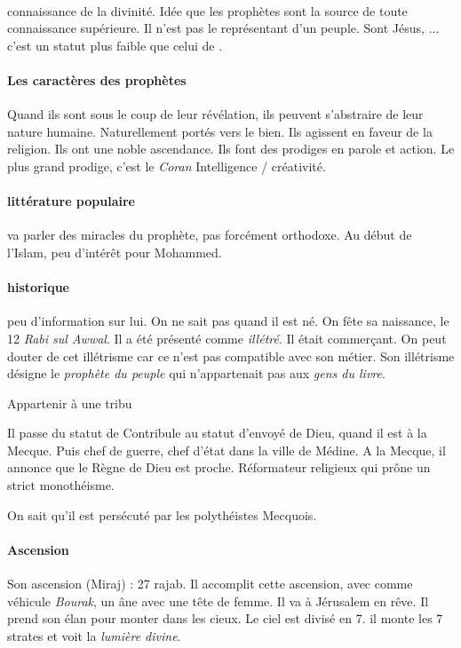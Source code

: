 \paragraph{\Nabi} connaissance de la divinité. Idée que les prophètes sont la source de toute connaissance supérieure. Il n'est pas le représentant d'un peuple. Sont \Nabi Jésus, ... c'est un statut plus faible que celui de \Rasul.

\paragraph{Les caractères des prophètes}
Quand ils sont sous le coup de leur révélation, ils peuvent s'abstraire de leur nature humaine.
Naturellement portés vers le bien.
Ils agissent en faveur de la religion.
Ils ont une noble ascendance.
Ils font des prodiges en parole et action. Le plus grand prodige, c'est le \textit{Coran}
Intelligence / créativité.



\paragraph{littérature populaire} va parler des miracles du prophète, pas forcément orthodoxe. Au début de l’Islam, peu d’intérêt pour Mohammed.

\paragraph{historique}  peu d’information sur lui. On ne sait pas quand il est né. On fête sa naissance, le 12 \textit{Rabi sul Awwal}.
Il a été présenté comme \textit{illétré}. Il était commerçant. On peut douter de cet illétrisme car ce n'est pas compatible avec son métier.
Son illétrisme désigne le \textit{prophète du peuple} qui n'appartenait pas aux \textit{gens du livre}. 

\begin{Def}[Contribule]
Appartenir à une tribu
\end{Def}
Il passe du statut de Contribule au statut d'envoyé de Dieu, quand il est à la Mecque. Puis chef de guerre, chef d'état dans la ville de Médine. 
A la Mecque, il annonce que le Règne de Dieu est proche. Réformateur religieux qui prône un strict monothéisme. 

On sait qu'il est persécuté par les polythéistes Mecquois.  
\paragraph{Ascension} Son ascension (Miraj) : 27 rajab. Il accomplit cette ascension, avec comme véhicule \textit{Bourak}, un âne avec une tête de femme. Il va à Jérusalem en rêve. Il prend son élan pour monter dans les cieux. Le ciel est divisé en 7. il monte les 7 strates et voit la \textit{lumière divine}.


